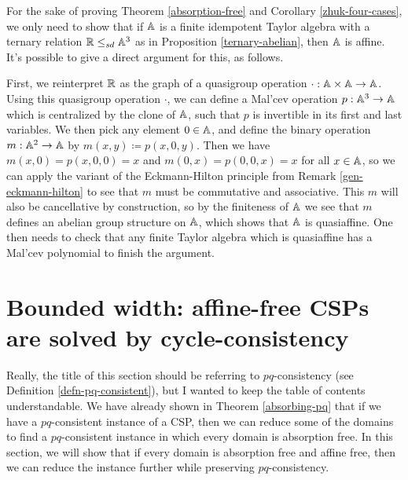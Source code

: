 \documentclass[letterpaper,11pt]{article}
\begin{document}
\begin{rem} For the sake of proving Theorem \ref{absorption-free} and Corollary \ref{zhuk-four-cases}, we only need to show that if $\mathbb{A}$ is a finite idempotent Taylor algebra with a ternary relation $\mathbb{R} \le_{sd} \mathbb{A}^3$ as in Proposition \ref{ternary-abelian}, then $\mathbb{A}$ is affine. It's possible to give a direct argument for this, as follows.

First, we reinterpret $\mathbb{R}$ as the graph of a quasigroup operation $\cdot : \mathbb{A} \times \mathbb{A} \rightarrow \mathbb{A}$. Using this quasigroup operation $\cdot$, we can define a Mal'cev operation $p : \mathbb{A}^3 \rightarrow \mathbb{A}$ which is centralized by the clone of $\mathbb{A}$, such that $p$ is invertible in its first and last variables. We then pick any element $0 \in \mathbb{A}$, and define the binary operation $m : \mathbb{A}^2 \rightarrow \mathbb{A}$ by $m(x,y) \coloneqq p(x,0,y)$. Then we have $m(x,0) = p(x,0,0) = x$ and $m(0,x) = p(0,0,x) = x$ for all $x \in \mathbb{A}$, so we can apply the variant of the Eckmann-Hilton principle from Remark \ref{gen-eckmann-hilton} to see that $m$ must be commutative and associative. This $m$ will also be cancellative by construction, so by the finiteness of $\mathbb{A}$ we see that $m$ defines an abelian group structure on $\mathbb{A}$, which shows that $\mathbb{A}$ is quasiaffine. One then needs to check that any finite Taylor algebra which is quasiaffine has a Mal'cev polynomial to finish the argument.
\end{rem}




\section{Bounded width: affine-free CSPs are solved by cycle-consistency}

Really, the title of this section should be referring to $pq$-consistency (see Definition \ref{defn-pq-consistent}), but I wanted to keep the table of contents understandable. We have already shown in Theorem \ref{absorbing-pq} that if we have a $pq$-consistent instance of a CSP, then we can reduce some of the domains to find a $pq$-consistent instance in which every domain is absorption free. In this section, we will show that if every domain is absorption free and affine free, then we can reduce the instance further while preserving $pq$-consistency.
\end{document}
